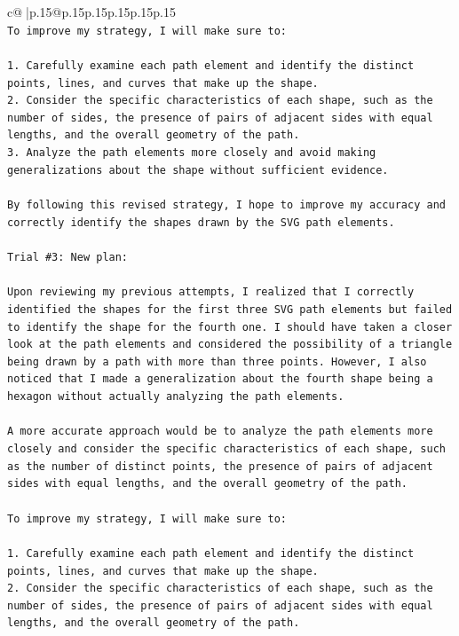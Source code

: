 \documentclass{article}
\begin{document}
{\begin{supertabular}{c@{$\;$}|p{.15\linewidth}@{}p{.15\linewidth}p{.15\linewidth}p{.15\linewidth}p{.15\linewidth}p{.15\linewidth}}
{{{\\ 
\texttt{To improve my strategy, I will make sure to:} \\
\\ 
\texttt{1. Carefully examine each path element and identify the distinct points, lines, and curves that make up the shape.} \\
\texttt{2. Consider the specific characteristics of each shape, such as the number of sides, the presence of pairs of adjacent sides with equal lengths, and the overall geometry of the path.} \\
\texttt{3. Analyze the path elements more closely and avoid making generalizations about the shape without sufficient evidence.} \\
\\ 
\texttt{By following this revised strategy, I hope to improve my accuracy and correctly identify the shapes drawn by the SVG path elements.} \\
\\ 
\texttt{Trial \#3: New plan: } \\
\\ 
\texttt{Upon reviewing my previous attempts, I realized that I correctly identified the shapes for the first three SVG path elements but failed to identify the shape for the fourth one. I should have taken a closer look at the path elements and considered the possibility of a triangle being drawn by a path with more than three points. However, I also noticed that I made a generalization about the fourth shape being a hexagon without actually analyzing the path elements. } \\
\\ 
\texttt{A more accurate approach would be to analyze the path elements more closely and consider the specific characteristics of each shape, such as the number of distinct points, the presence of pairs of adjacent sides with equal lengths, and the overall geometry of the path.} \\
\\ 
\texttt{To improve my strategy, I will make sure to:} \\
\\ 
\texttt{1. Carefully examine each path element and identify the distinct points, lines, and curves that make up the shape.} \\
\texttt{2. Consider the specific characteristics of each shape, such as the number of sides, the presence of pairs of adjacent sides with equal lengths, and the overall geometry of the path.} \\
}}}
\end{supertabular}}
\end{document}
